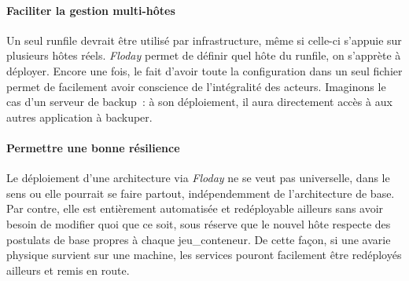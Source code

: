 \paragraph{Faciliter la gestion multi-hôtes}
Un seul \gls{runfile} devrait être utilisé par infrastructure, même si celle-ci s'appuie sur plusieurs hôtes réels.
\emph{Floday} permet de définir quel hôte du runfile, on s'apprète à déployer.
Encore une fois, le fait d'avoir toute la configuration dans un seul fichier permet de facilement avoir conscience de l'intégralité des acteurs.
Imaginons le cas d'un serveur de backup~: à son déploiement, il aura directement accès à aux autres \gls{application} à backuper.

\paragraph{Permettre une bonne résilience}
Le déploiement d'une architecture via \emph{Floday} ne se veut pas universelle, dans le sens ou elle pourrait se faire partout, indépendemment de l'architecture de base.
Par contre, elle est entièrement automatisée et redéployable ailleurs sans avoir besoin de modifier quoi que ce soit, sous réserve que le nouvel hôte respecte des postulats de base propres à chaque \gls{jeu_conteneur}.
De cette façon, si une avarie physique survient sur une machine, les services pouront facilement être redéployés ailleurs et remis en route.
